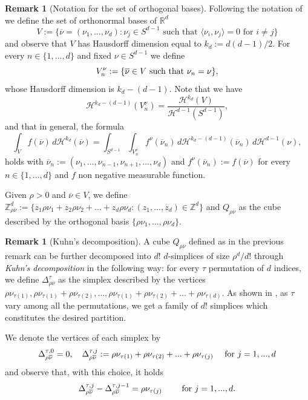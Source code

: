 \documentclass[11pt,a4paper,reqno]{amsart}
\theoremstyle{plain}
\theoremstyle{definition}
\newtheorem{remark}[theorem]{Remark}
\theoremstyle{remark}
\begin{document}
\begin{remark}[Notation for the set of orthogonal bases]\label{notation}
Following the notation of \cite{solci2023} we define the set of orthonormal bases of $\mathbb{R}^d$
\[
V:=\{\overline{\nu}=(\nu_1,...,\nu_d) : \nu_j \in S^{d-1} \text{ such that } \langle\nu_i, \nu_j\rangle=0 \text{ for } i\neq j \}
\]
and observe that $V$ has Hausdorff dimension equal to $k_d:=d(d-1)/2$. 
For every $n\in\{1,...,d\}$ and fixed $\nu\in S^{d-1}$ we define
\[
V_n^{\nu}:= \{\overline{\nu}\in V \hbox{ such that } \nu_n=\nu\},
\]
whose Hausdorff dimension is $k_d-(d-1)$. Note that we have
\begin{equation} \label{hausdorffmeas}
\mathcal{H}^{k_d-(d-1)}(V_n^\nu)=\frac{\mathcal{H}^{k_d}(V)}{\mathcal{H}^{d-1}(S^{d-1})},
\end{equation}
and that in general, the formula
\begin{equation}\label{disintegration}
\int_{V}f(\overline{\nu})\, d\mathcal{H}^{k_d}(\overline{\nu}) = \int_{S^{d-1}} 
\int_{V_n^\nu} f^\nu(\overline{\nu}_n) \,d\mathcal{H}^{k_d-(d-1)} (\overline{\nu}_n)\,d\mathcal{H}^{d-1}(\nu),
\end{equation}
holds with $\overline{\nu}_n:=(\nu_1,...,\nu_{n-1}, \nu_{n+1},...,\nu_d)$ and $f^\nu(\overline{\nu}_n):= f(\overline{\nu})$ for every $n\in\{1,...,d\}$ and $f$ non negative measurable function.

\smallskip

Given $\rho>0$ and $\overline{\nu}\in V$, we define $\mathbb Z^d_{\rho\overline{\nu}}:=\{z_1\rho\nu_1+z_2\rho\nu_2+...+z_d\rho\nu_d : (z_1,...,z_d)\in \mathbb Z^d\}$ and $Q_{\rho\overline{\nu}}$ as the cube described by the orthogonal basis $\{\rho\nu_1,...,\rho\nu_d\}$.
\end{remark}

\begin{remark}[Kuhn's decomposition]\label{re:remark1}  
A cube $Q_{\rho\overline{\nu}}$ defined as in the previous remark can be further decomposed into $d!$ $d$-simplices of size $\rho^d/d!$ through {\em Kuhn's decomposition} in the following way: for every $\tau$ permutation of $d$ indices, we define $\Delta_{\rho\overline{\nu}}^{\tau}$ as the simplex described by the vertices $\rho\nu_{\tau(1)}, \rho\nu_{\tau(1)}+\rho\nu_{\tau(2)},..., \rho\nu_{\tau(1)}+\rho\nu_{\tau(2)}+...+\rho\nu_{\tau(d)}$. As shown in \cite[Lemma 1]{Kuhn1960}, as $\tau$ vary among all the permutations, we get a family of $d!$ simplices which constitutes the desired partition.

We denote the vertices of each simplex by 
\[
\Delta_{\rho\overline{\nu}}^{\tau,0}=0, \quad    \Delta_{\rho\overline{\nu}}^{\tau,j}:=\rho\nu_{\tau(1)}+\rho\nu_{\tau(2)}+...+\rho\nu_{\tau(j)}
\quad \hbox{ for } j=1,...,d
\]
and observe that, with this choice, it holds
\begin{equation} \label{vertices}
\Delta_{\rho\overline{\nu}}^{\tau, j}-\Delta_{\rho\overline{\nu}}^{\tau, j-1}=\rho\nu_{\tau(j)} \qquad \hbox{ for } j=1,...,d.
\end{equation}
\end{remark}
\end{document}
